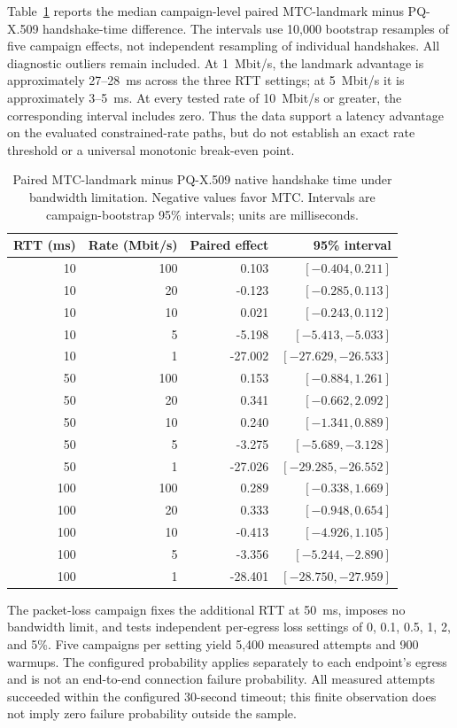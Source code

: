 \documentclass[journal]{IEEEtran}
\begin{document}
Table~\ref{tab:bandwidth-mtc-effects} reports the median campaign-level paired MTC-landmark minus PQ-X.509 handshake-time difference. The intervals use 10,000 bootstrap resamples of five campaign effects, not independent resampling of individual handshakes. All diagnostic outliers remain included. At 1~Mbit/s, the landmark advantage is approximately 27--28~ms across the three RTT settings; at 5~Mbit/s it is approximately 3--5~ms. At every tested rate of 10~Mbit/s or greater, the corresponding interval includes zero. Thus the data support a latency advantage on the evaluated constrained-rate paths, but do not establish an exact rate threshold or a universal monotonic break-even point.

\begin{table}[t]
\caption{Paired MTC-landmark minus PQ-X.509 native handshake time under bandwidth limitation. Negative values favor MTC. Intervals are campaign-bootstrap 95\% intervals; units are milliseconds.}
\label{tab:bandwidth-mtc-effects}
\centering
\footnotesize
\begin{tabular}{rrrr}
\toprule
RTT (ms) & Rate (Mbit/s) & Paired effect & 95\% interval \\
\midrule
10 & 100 & 0.103 & $[-0.404, 0.211]$ \\
10 & 20 & -0.123 & $[-0.285, 0.113]$ \\
10 & 10 & 0.021 & $[-0.243, 0.112]$ \\
10 & 5 & -5.198 & $[-5.413, -5.033]$ \\
10 & 1 & -27.002 & $[-27.629, -26.533]$ \\
50 & 100 & 0.153 & $[-0.884, 1.261]$ \\
50 & 20 & 0.341 & $[-0.662, 2.092]$ \\
50 & 10 & 0.240 & $[-1.341, 0.889]$ \\
50 & 5 & -3.275 & $[-5.689, -3.128]$ \\
50 & 1 & -27.026 & $[-29.285, -26.552]$ \\
100 & 100 & 0.289 & $[-0.338, 1.669]$ \\
100 & 20 & 0.333 & $[-0.948, 0.654]$ \\
100 & 10 & -0.413 & $[-4.926, 1.105]$ \\
100 & 5 & -3.356 & $[-5.244, -2.890]$ \\
100 & 1 & -28.401 & $[-28.750, -27.959]$ \\
\bottomrule
\end{tabular}
\end{table}

The packet-loss campaign fixes the additional RTT at 50~ms, imposes no bandwidth limit, and tests independent per-egress loss settings of 0, 0.1, 0.5, 1, 2, and 5\%. Five campaigns per setting yield 5,400 measured attempts and 900 warmups. The configured probability applies separately to each endpoint's egress and is not an end-to-end connection failure probability. All measured attempts succeeded within the configured 30-second timeout; this finite observation does not imply zero failure probability outside the sample.
\end{document}
